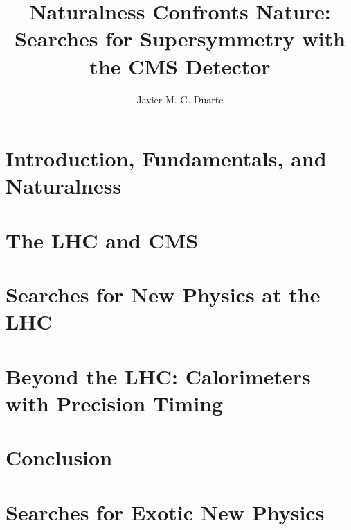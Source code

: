 \documentclass[12pt]{caltech_thesis}
\begin{document}
\author{Javier M. G. Duarte}
\title{Naturalness Confronts Nature: Searches for Supersymmetry with
  the CMS Detector}


\address{Pasadena, California}                     %



\maketitle[logo]                  %




\tableofcontents
\listoffigures
\listoftables
\printnomenclature

\mainmatter

\part{Introduction, Fundamentals, and Naturalness}
\label{part:intro}



\part{The LHC and CMS}
\label{part:lhccms}


\part{Searches for New Physics at the LHC}
\label{part:searches}



\part{Beyond the LHC: Calorimeters with Precision Timing}
\label{part:timing}

\part{Conclusion}
\label{part:conclusion}


%


\printbibliography[heading=bibintoc]

\printindex
\appendix
\part{Searches for Exotic New Physics}
\label{part:app}

\end{document}
